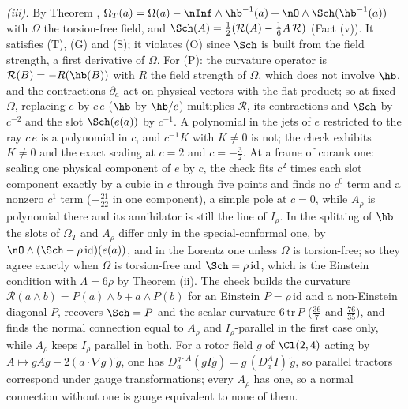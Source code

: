 \emph{(iii).} By Theorem , $\Omega_{T}(a) = \Omega(a) - \nInf \wedge \hb^{-1}(a) + \nO \wedge \Sch(\hb^{-1}(a))$ with $\Omega$ the torsion-free field, and $\Sch(A) = \tfrac12(\mathcal{R}(A) - \tfrac16 A\,\mathcal{R})$ (Fact (v)). It satisfies (T), (G) and (S); it violates (O) since $\Sch$ is built from the field strength, a first derivative of $\Omega$. For (P): the curvature operator is $\mathcal{R}(B) = -R(\hb(B))$ with $R$ the field strength of $\Omega$, which does not involve $\hb$, and the contractions $\partial_{a}$ act on physical vectors with the flat product; so at fixed $\Omega$, replacing $e$ by $c\,e$ ($\hb$ by $\hb/c$) multiplies $\mathcal{R}$, its contractions and $\Sch$ by $c^{-2}$ and the slot $\Sch(e(a))$ by $c^{-1}$. A polynomial in the jets of $e$ restricted to the ray $c\,e$ is a polynomial in $c$, and $c^{-1}K$ with $K \neq 0$ is not; the check exhibits $K \neq 0$ and the exact scaling at $c = 2$ and $c = -\tfrac32$. At a frame of corank one: scaling one physical component of $e$ by $c$, the check fits $c^{2}$ times each slot component exactly by a cubic in $c$ through five points and finds no $c^{0}$ term and a nonzero $c^{1}$ term ($-\tfrac{21}{22}$ in one component), a simple pole at $c = 0$, while $A_{\rho}$ is polynomial there and its annihilator is still the line of $I_{\rho}$. In the splitting of $\hb$ the slots of $\Omega_{T}$ and $A_{\rho}$ differ only in the special-conformal one, by $\nO \wedge (\Sch - \rho\,\mathrm{id})(e(a))$, and in the Lorentz one unless $\Omega$ is torsion-free; so they agree exactly when $\Omega$ is torsion-free and $\Sch = \rho\,\mathrm{id}$, which is the Einstein condition with $\Lambda = 6\rho$ by Theorem (ii). The check builds the curvature $\mathcal{R}(a \wedge b) = P(a) \wedge b + a \wedge P(b)$ for an Einstein $P = \rho\,\mathrm{id}$ and a non-Einstein diagonal $P$, recovers $\Sch = P$ and the scalar curvature $6\,\mathrm{tr}\,P$ ($\tfrac{36}{7}$ and $\tfrac{76}{35}$), and finds the normal connection equal to $A_{\rho}$ and $I_{\rho}$-parallel in the first case only, while $A_{\rho}$ keeps $I_{\rho}$ parallel in both. For a rotor field $g$ of $\Cl(2,4)$ acting by $A \mapsto gA\tilde g - 2(a \cdot \nabla g)\tilde g$, one has $D^{g \cdot A}_{a}(g I \tilde g) = g\,(D^{A}_{a} I)\,\tilde g$, so parallel tractors correspond under gauge transformations; every $A_{\rho}$ has one, so a normal connection without one is gauge equivalent to none of them.

